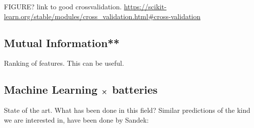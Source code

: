 FIGURE?
link to good crossvalidation.
\url{https://scikit-learn.org/stable/modules/cross_validation.html#cross-validation}

\subsection{Mutual Information**}
Ranking of features. 
This can be useful.

\subsection{Machine Learning $\cross$ batteries}
State of the art.
What has been done in this field? 
Similar predictions of the kind we are interested in, have been done by 
Sandek: \cite{sendek2017holistic}


















